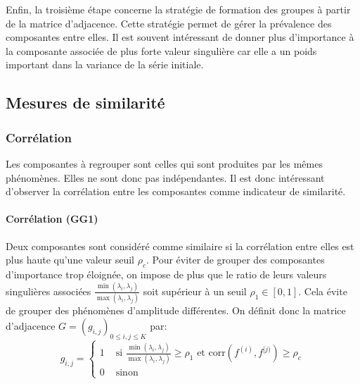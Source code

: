 \documentclass{gretsi}
\newcommand{\inter}{\left[0, 1\right]}
\begin{document}
Enfin, la troisième étape concerne la stratégie de formation des groupes à partir de la matrice d'adjacence. Cette stratégie permet de gérer la prévalence des composantes entre elles. Il est souvent intéressant de donner plus d'importance à la composante associée de plus forte valeur singulière car elle a un poids important dans la variance de la série initiale.


\subsection{Mesures de similarité}
\label{sub:sim}

\subsubsection{Corrélation}\label{ssub:cor}

Les composantes à regrouper sont celles qui sont produites par les mêmes phénomènes. Elles ne sont donc pas indépendantes. Il est donc intéressant d'observer la corrélation entre les composantes comme indicateur de similarité.

\paragraph{Corrélation (GG1)}\label{par:GG1}
    Deux composantes sont considéré comme similaire si la corrélation entre elles est plus haute qu'une valeur seuil $\rho_c$\cite{abalov_14_auto}. Pour éviter de grouper des composantes d'importance trop éloignée, on impose de plus que le ratio de leurs valeurs singulières associées $\frac{\min(\lambda_i, \lambda_j)}{\max(\lambda_i, \lambda_j)}$ soit supérieur à un seuil $\rho_1 \in \inter$. Cela évite de grouper des phénomènes d'amplitude différentes. On définit donc la matrice d'adjacence $G = (g_{i, j})_{0 \le i,j\le K}$ par:
    $$
    g_{i, j} = \begin{cases}
	    1 &\text{ si } \displaystyle\frac{\min(\lambda_i, \lambda_j)}{\max(\lambda_i, \lambda_j)} \ge \rho_1 \text{ et } \text{corr}(f^{(i)}, f^{[j)}) \ge \rho_c\\
	    0& \text{ sinon}
    \end{cases}
    $$
\end{document}
